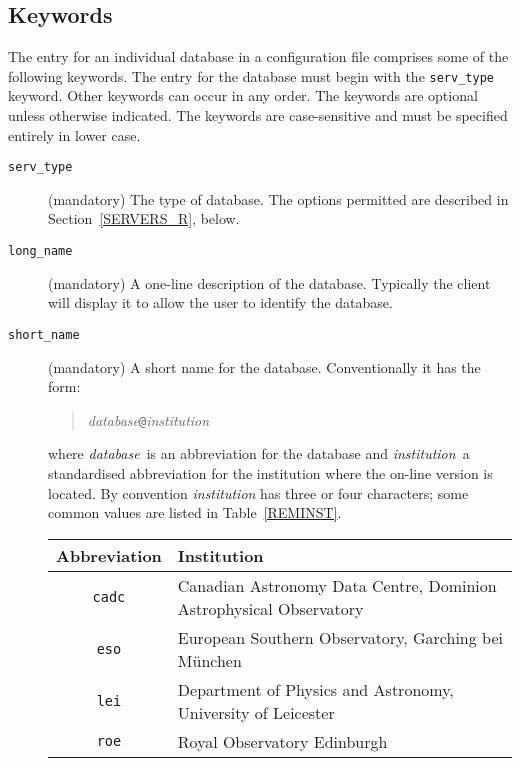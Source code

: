 \documentclass[twoside,11pt,nolof,chapters]{starlink}
\begin{document}
\subsection{\label{KEYWORDS_R}Keywords}

The entry for an individual database in a configuration file comprises
some of the following keywords.  The entry for the database must begin
with the \texttt{serv\_type} keyword.  Other keywords can occur in any
order.  The keywords are optional unless otherwise indicated.  The
keywords are case-sensitive and must be specified entirely in lower case.

\begin{description}

  \item[\texttt{serv\_type}] (mandatory) The type of database.  The
   options permitted are described in Section~\ref{SERVERS_R}, below.

  \item[\texttt{long\_name}] (mandatory) A one-line description of the
   database.  Typically the client will display it to allow the user to
   identify the database.

  \item[\texttt{short\_name}] (mandatory) A short name for the database.
   Conventionally it has the form:

  \begin{quote}
   \textit{database}\texttt{@}\textit{institution}
  \end{quote}

   where \textit{database}\, is an abbreviation for the database and \textit{institution}\, a standardised abbreviation for the institution where the
   on-line version is located.  By convention \textit{institution}\/ has three
   or four characters; some common values are listed in Table~\ref{REMINST}.

\begin{table}[htbp]

\begin{center}
\begin{tabular}{cl}
Abbreviation  &  Institution  \\ \hline
\texttt{cadc} & Canadian Astronomy Data Centre, Dominion Astrophysical
    Observatory  \\
\texttt{eso} &  European Southern Observatory, Garching bei M\"{u}nchen \\
\texttt{lei} &  Department of Physics and Astronomy, University of Leicester \\
\texttt{roe} &  Royal Observatory Edinburgh \\
\end{tabular}
\end{center}


\end{table}
\end{description}
\end{document}
